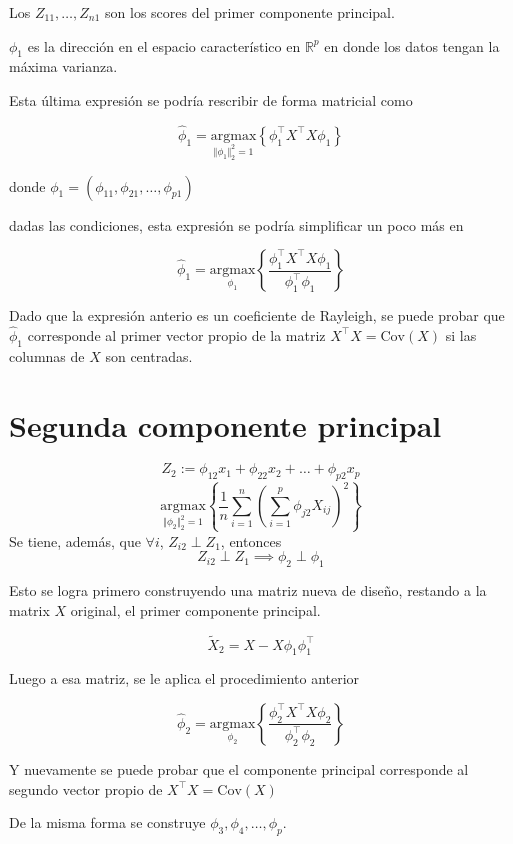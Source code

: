 \documentclass[
  12pt,
]{book}
\begin{document}
Los \(Z_{11},\dots, Z_{n1}\) son los scores del primer componente
principal.

\(\phi_1\) es la dirección en el espacio característico en
\(\mathbb{R}^p\) en donde los datos tengan la máxima varianza.

Esta última expresión se podría rescribir de forma matricial como

\[
\hat{\phi}_1 = \underset{\Vert\phi_1\Vert_2^2=1}{\mathrm{argmax}} \left\{ \phi_1^\top X^\top X \phi_1 \right\}
\]

donde \(\phi_1 = (\phi_{11}, \phi_{21},\dots,\phi_{p1})\)

dadas las condiciones, esta expresión se podría simplificar un poco más
en

\[
\hat{\phi}_1 = \underset{\phi_1}{\mathrm{argmax}} \left\{\frac{\phi_1^\top X^\top X \phi_1 }{\phi_1^\top \phi_1}\right\}
\]

Dado que la expresión anterio es un coeficiente de Rayleigh, se puede
probar que \(\hat{\phi}_{1}\) corresponde al primer vector propio de la
matriz \(X^\top X = \mathrm{Cov}(X)\) si las columnas de \(X\) son
centradas.

\hypertarget{segunda-componente-principal}{%
\section{Segunda componente
principal}\label{segunda-componente-principal}}

\[ Z_{2}:= \phi_{12}x_1 + \phi_{22}x_2+\dots+\phi_{p2}x_p\]
\[\underset{\Vert\phi_2\Vert_2^2=1}{\mathrm{argmax}} \left\lbrace\dfrac{1}{n}\sum_{i=1}^{n}\left(\sum_{i=1}^p \phi_{j2} X_{ij} \right)^2 \right\rbrace\]
Se tiene, además, que \(\forall i\), \(Z_{i2}\perp Z_1\), entonces
\[ Z_{i2}\perp Z_1 \implies \phi_{2} \perp \phi_{1}\]

Esto se logra primero construyendo una matriz nueva de diseño, restando
a la matrix \(X\) original, el primer componente principal.

\[
\tilde{X}_2 = X - X\phi_1\phi_1^\top
\]

Luego a esa matriz, se le aplica el procedimiento anterior

\[
\hat{\phi}_2 = \underset{\phi_2}{\mathrm{argmax}} \left\{\frac{\phi_2^\top X^\top X \phi_2 }{\phi_2^\top \phi_2}\right\}
\]

Y nuevamente se puede probar que el componente principal corresponde al
segundo vector propio de \(X^\top X = \mathrm{Cov}(X)\)

De la misma forma se construye \(\phi_3,\phi_4,\dots, \phi_p\).
\end{document}
